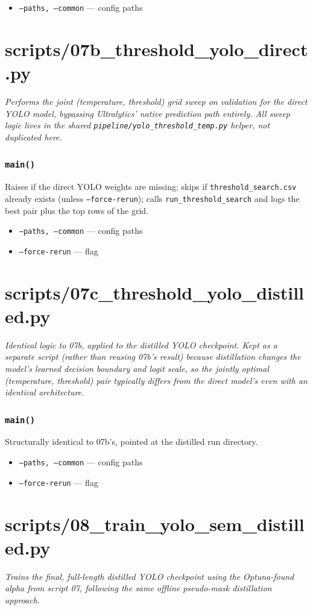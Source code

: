 \documentclass[11pt]{article}
\newcommand{\role}[1]{\par\noindent\textit{#1}\par\vspace{0.5em}}
\newcommand{\func}[1]{\subsubsection*{\texttt{#1}}}
\newcommand{\cliarg}[2]{\item \texttt{#1} --- #2}
\begin{document}
\begin{itemize}[nosep]
\cliarg{--paths, --common}{config paths}
\end{itemize}

\section{scripts/07b\_threshold\_yolo\_direct.py}
\role{Performs the joint (temperature, threshold) grid sweep on validation for
the \emph{direct} YOLO model, bypassing Ultralytics' native prediction path
entirely. All sweep logic lives in the shared
\texttt{pipeline/yolo\_threshold\_temp.py} helper, not duplicated here.}

\func{main()}
Raises if the direct YOLO weights are missing; skips if
\texttt{threshold\_search.csv} already exists (unless \texttt{--force-rerun});
calls \texttt{run\_threshold\_search} and logs the best pair plus the top rows
of the grid.

\begin{itemize}[nosep]
\cliarg{--paths, --common}{config paths}
\cliarg{--force-rerun}{flag}
\end{itemize}

\section{scripts/07c\_threshold\_yolo\_distilled.py}
\role{Identical logic to 07b, applied to the \emph{distilled} YOLO checkpoint.
Kept as a separate script (rather than reusing 07b's result) because
distillation changes the model's learned decision boundary and logit scale, so
the jointly optimal (temperature, threshold) pair typically differs from the
direct model's even with an identical architecture.}

\func{main()}
Structurally identical to 07b's, pointed at the distilled run directory.

\begin{itemize}[nosep]
\cliarg{--paths, --common}{config paths}
\cliarg{--force-rerun}{flag}
\end{itemize}

\section{scripts/08\_train\_yolo\_sem\_distilled.py}
\role{Trains the final, full-length distilled YOLO checkpoint using the
Optuna-found alpha from script 07, following the same offline pseudo-mask
distillation approach.}
\end{document}
